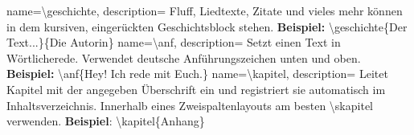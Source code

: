 
{
    name={\textbackslash geschichte},
    description={
            Fluff, Liedtexte, Zitate und vieles mehr können in dem kursiven, eingerückten Geschichtsblock stehen.\newline
            \textbf{Beispiel: }\textbackslash geschichte\{Der Text...\}\{Die Autorin\}
        }
}
{
    name={\textbackslash anf},
    description={
            Setzt einen Text in Wörtlicherede. Verwendet deutsche Anführungszeichen unten und oben.
            \textbf{Beispiel: }\textbackslash anf\{Hey! Ich rede mit Euch.\}
        }
}
{
    name={\textbackslash kapitel},
    description={
            Leitet Kapitel mit der angegeben Überschrift ein und registriert sie automatisch im Inhaltsverzeichnis. Innerhalb eines Zweispaltenlayouts am besten \textbackslash skapitel verwenden.
            \textbf{Beispiel}: \textbackslash kapitel\{Anhang\}}
}


